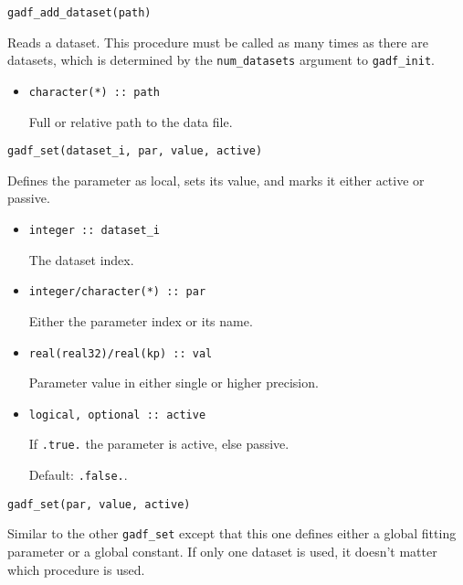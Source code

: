 \documentclass{article}
\begin{document}
\begin{verbatim}
gadf_add_dataset(path)
\end{verbatim}
Reads a dataset. This procedure must be called as many times as there are datasets, which is determined by the \verb+num_datasets+ argument to \verb+gadf_init+.
\begin{itemize}
\item
\begin{verbatim}
character(*) :: path
\end{verbatim}
  Full or relative path to the data file.
\end{itemize}

\begin{verbatim}
gadf_set(dataset_i, par, value, active)
\end{verbatim}
Defines the parameter as local, sets its value, and marks it either active or passive.
\begin{itemize}
\item 
\begin{verbatim}
integer :: dataset_i
\end{verbatim}
  The dataset index.
\item 
\begin{verbatim}
integer/character(*) :: par
\end{verbatim}
  Either the parameter index or its name.
\item 
\begin{verbatim}
real(real32)/real(kp) :: val
\end{verbatim}
  Parameter value in either single or higher precision.
\item 
\begin{verbatim}
logical, optional :: active
\end{verbatim}
  If \verb+.true.+ the parameter is active, else passive.
  
  Default: \verb+.false.+.
\end{itemize}

\begin{verbatim}
gadf_set(par, value, active)
\end{verbatim}
Similar to the other \verb+gadf_set+ except that this one defines either a global fitting parameter or a global constant. If only one dataset is used, it doesn't matter which procedure is used.
\end{document}

